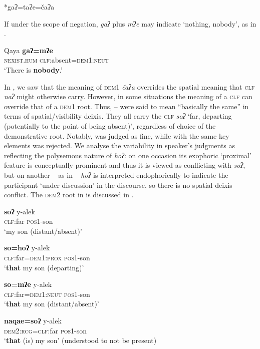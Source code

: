 \documentclass[output=paper,colorlinks,citecolor=brown]{langscibook}
\begin{document}
\ea\label{ex:payne:51}
  *gaʔ=taʔe=čaʔa\\
\z

If under the scope of negation, \textit{gaʔ} plus \textit{mʔe} may indicate ‘nothing, nobody’, as in .

\ea\label{ex:payne:52}
\gll  Qaya  \textbf{gaʔ=mʔe}\\
\textsc{nexist.hum}  \textsc{clf}:absent=\textsc{dem1:neut}\\
\glt ‘There is \textbf{nobody}.’
\z

In , we saw that the meaning of \textsc{dem1} \textit{čaʔa} overrides the spatial meaning that \textsc{clf} \textit{naʔ} might otherwise carry. However, in some situations the meaning of a \textsc{clf} can override that of a \textsc{dem1} root. Thus, – were said to mean “basically the same” in terms of spatial/visibility deixis. They all carry the \textsc{clf} \textit{soʔ} ‘far, departing (potentially to the point of being absent)’, regardless of choice of the demonstrative root. Notably,  was judged as fine, while  with the same key elements was rejected. We analyse the variability in speaker’s judgments as reflecting the polysemous nature of \textit{hoʔ}: on one occasion its exophoric ‘proximal’ feature is conceptually prominent and thus it is viewed as conflicting with \textit{soʔ}, but on another – as in  – \textit{hoʔ} is interpreted endophorically to indicate the participant ‘under discussion’ in the discourse, so there is no spatial deixis conflict. The \textsc{dem2} root in  is discussed in .

\ea\label{ex:payne:53}
\gll  \textbf{soʔ}  y-alek\\
\textsc{clf}:far  \textsc{pos1}-son\\
\glt ‘my son (distant/absent)’
\z

\ea\label{ex:payne:54}
\gll  \textbf{so=hoʔ}  y-alek\\
\textsc{clf}:far=\textsc{dem1:prox}  \textsc{pos1}-son\\
\glt ‘\textbf{that} my son (departing)’
\z

\ea\label{ex:payne:55}
\gll  \textbf{so=mʔe}  y-alek\\
\textsc{clf}:far=\textsc{dem1:neut}  \textsc{pos1}-son\\
\glt ‘\textbf{that} my son (distant/absent)’
\z

\ea\label{ex:payne:56}
\gll  \textbf{naqae=soʔ}  y-alek\\
\textsc{dem2:rcg=clf}:far  \textsc{pos1}-son\\
\glt ‘\textbf{that} (is) my son’ (understood to not be present)
\z
\end{document}
